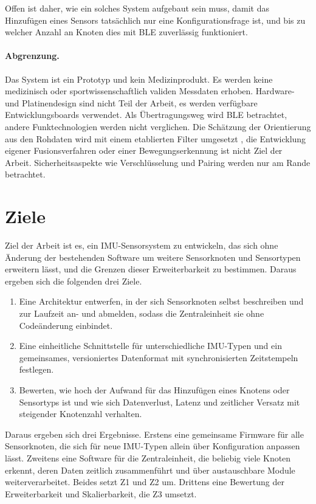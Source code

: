 \documentclass[11pt, a4paper]{article}
\begin{document}
Offen ist daher, wie ein solches System aufgebaut sein muss, damit das Hinzufügen eines Sensors tatsächlich nur eine Konfigurationsfrage ist, und bis zu welcher Anzahl an Knoten dies mit BLE zuverlässig funktioniert.

\paragraph{Abgrenzung.} Das System ist ein Prototyp und kein Medizinprodukt. Es werden keine medizinisch oder sportwissenschaftlich validen Messdaten erhoben. Hardware- und Platinendesign sind nicht Teil der Arbeit, es werden verfügbare Entwicklungsboards verwendet. Als Übertragungsweg wird BLE betrachtet, andere Funktechnologien werden nicht verglichen. Die Schätzung der Orientierung aus den Rohdaten wird mit einem etablierten Filter umgesetzt \cite{madgwick2011orientation}, die Entwicklung eigener Fusionsverfahren oder einer Bewegungserkennung ist nicht Ziel der Arbeit. Sicherheitsaspekte wie Verschlüsselung und Pairing werden nur am Rande betrachtet.

\section{Ziele}

Ziel der Arbeit ist es, ein IMU-Sensorsystem zu entwickeln, das sich ohne Änderung der bestehenden Software um weitere Sensorknoten und Sensortypen erweitern lässt, und die Grenzen dieser Erweiterbarkeit zu bestimmen. Daraus ergeben sich die folgenden drei Ziele.

\begin{enumerate}[label=\textbf{Z\arabic*}, leftmargin=*, nosep]
    \item Eine Architektur entwerfen, in der sich Sensorknoten selbst beschreiben und zur Laufzeit an- und abmelden, sodass die Zentraleinheit sie ohne Codeänderung einbindet.
    \item Eine einheitliche Schnittstelle für unterschiedliche IMU-Typen und ein gemeinsames, versioniertes Datenformat mit synchronisierten Zeitstempeln festlegen.
    \item Bewerten, wie hoch der Aufwand für das Hinzufügen eines Knotens oder Sensortyps ist und wie sich Datenverlust, Latenz und zeitlicher Versatz mit steigender Knotenzahl verhalten.
\end{enumerate}

Daraus ergeben sich drei Ergebnisse. Erstens eine gemeinsame Firmware für alle Sensorknoten, die sich für neue IMU-Typen allein über Konfiguration anpassen lässt. Zweitens eine Software für die Zentraleinheit, die beliebig viele Knoten erkennt, deren Daten zeitlich zusammenführt und über austauschbare Module weiterverarbeitet. Beides setzt Z1 und Z2 um. Drittens eine Bewertung der Erweiterbarkeit und Skalierbarkeit, die Z3 umsetzt.
\end{document}
